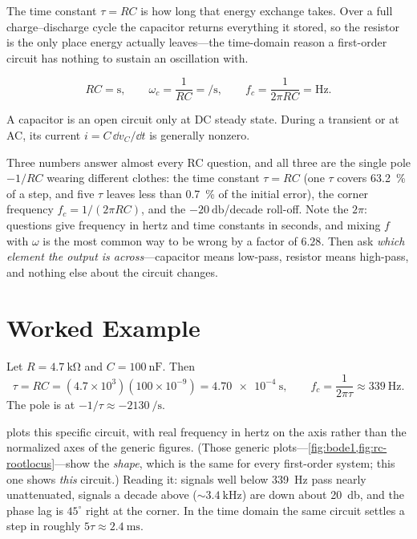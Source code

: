 \begin{energybox}
The time constant \(\tau=RC\) is how long that energy exchange takes. Over a full
charge--discharge cycle the capacitor returns everything it stored, so the resistor is
the only place energy actually leaves---the time-domain reason a first-order circuit
has nothing to sustain an oscillation with.
\end{energybox}

\begin{unitsbox}
\[
RC=\si{\second},\qquad
\omega_c=\frac{1}{RC}=\si{\per\second},\qquad
f_c=\frac{1}{2\pi RC}=\si{\hertz}.
\]
\end{unitsbox}

\begin{mistakebox}
A capacitor is an open circuit only at DC steady state. During a transient or at
AC, its current \(i=C\,\dd v_C/\dd t\) is generally nonzero.
\end{mistakebox}

\begin{exambox}
Three numbers answer almost every RC question, and all three are the single pole
\(-1/RC\) wearing different clothes: the time constant \(\tau=RC\) (one \(\tau\)
covers \SI{63.2}{\percent} of a step, and five \(\tau\) leaves less than
\SI{0.7}{\percent} of the initial error), the corner
frequency \(f_c=1/(2\pi RC)\), and the \(-\SI{20}{\decibel}\)/decade roll-off. Note
the \(2\pi\): questions give frequency in hertz and time constants in seconds, and
mixing \(f\) with \(\omega\) is the most common way to be wrong by a factor of
\(6.28\). Then ask \emph{which element the output is across}---capacitor means
low-pass, resistor means high-pass, and nothing else about the circuit changes.
\end{exambox}

\section{Worked Example}
Let \(R=\SI{4.7}{\kilo\ohm}\) and \(C=\SI{100}{\nano\farad}\). Then
\[
\tau=RC=(4.7\times10^3)(100\times10^{-9})=\SI{4.70e-4}{\second},
\qquad
f_c=\frac{1}{2\pi\tau}\approx\SI{339}{\hertz}.
\]
The pole is at \(-1/\tau\approx-\SI{2130}{\per\second}\).

 plots this specific circuit, with real frequency in hertz on
the axis rather than the normalized axes of the generic figures. (Those generic
plots---\cref{fig:bode1,fig:rc-rootlocus}---show the \emph{shape}, which is the
same for every first-order system; this one shows \emph{this} circuit.) Reading it:
signals well below \SI{339}{\hertz} pass nearly unattenuated, signals a decade above
(\(\sim\!\SI{3.4}{\kilo\hertz}\)) are down about \SI{20}{\decibel}, and the phase
lag is \(45^\circ\) right at the corner. In the time domain the same circuit settles
a step in roughly \(5\tau\approx\SI{2.4}{\milli\second}\).

